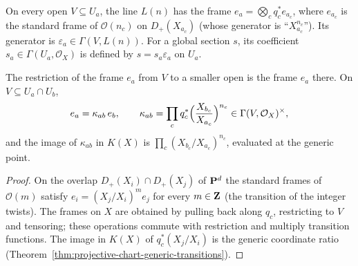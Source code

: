 \begin{definition}
\label{def:pm-chart-frame}
\leanok
{}
On every open $V\subseteq U_a$, the line $L(n)$ has the frame $e_a=\bigotimes_cq_c^*e_{a_c}$,
where $e_{a_c}$ is the standard frame of $\mathcal O(n_c)$ on $D_+(X_{a_c})$ (whose generator
is ``$X_{a_c}^{n_c}$''). Its generator is $\varepsilon_a\in\Gamma(V,L(n))$. For a global
section $s$, its coefficient $s_a\in\Gamma(U_a,\mathcal O_X)$ is defined by $s=s_a\varepsilon_a$
on $U_a$.
\end{definition}

\begin{lemma}
\label{lem:pm-frame-transition}
\leanok
{}
The restriction of the frame $e_a$ from $V$ to a smaller open is the frame $e_a$ there. On
$V\subseteq U_a\cap U_b$,
\[
e_a=\kappa_{ab}\,e_b,\qquad
\kappa_{ab}=\prod_cq_c^*\Bigl(\frac{X_{b_c}}{X_{a_c}}\Bigr)^{n_c}\in\Gamma(V,\mathcal O_X)^\times,
\]
and the image of $\kappa_{ab}$ in $K(X)$ is $\prod_c(X_{b_c}/X_{a_c})^{n_c}$, evaluated at the
generic point.
\end{lemma}
\begin{proof}
\leanok
On the overlap $D_+(X_i)\cap D_+(X_j)$ of $\mathbf{P}^d$ the standard frames of $\mathcal O(m)$
satisfy $e_i=(X_j/X_i)^m e_j$ for every $m\in\mathbf{Z}$ (the transition of the integer twists). The
frames on $X$ are obtained by pulling back along $q_c$, restricting to $V$ and tensoring; these
operations commute with restriction and multiply transition functions. The image in $K(X)$ of
$q_c^*(X_j/X_i)$ is the generic coordinate ratio
(Theorem~\ref{thm:projective-chart-generic-transitions}).
\end{proof}

